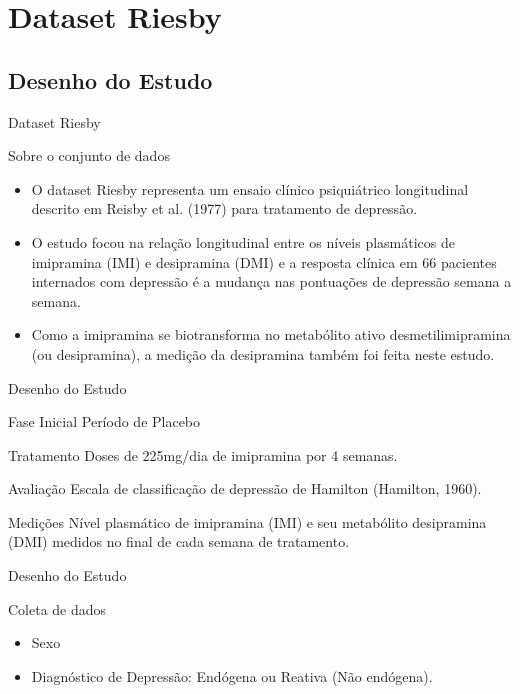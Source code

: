 \section{Dataset Riesby}
\subsection{Desenho do Estudo}
\begin{frame}{Dataset Riesby}
    \begin{block}{Sobre o conjunto de dados}
    	\begin{itemize}
    		\justifying
    		\item O dataset Riesby representa um ensaio clínico psiquiátrico longitudinal descrito em Reisby et al. (1977) para tratamento de depressão.
    		\item O estudo focou na relação longitudinal entre os níveis plasmáticos de imipramina (IMI) e desipramina (DMI) e a resposta clínica em 66 pacientes internados com depressão é a mudança nas pontuações de depressão semana a semana.
    		\item Como a imipramina se biotransforma no metabólito ativo desmetilimipramina (ou desipramina), a medição da desipramina também foi feita neste estudo.
    	\end{itemize}
    \end{block}
\end{frame}

\begin{frame}{Desenho do Estudo}
	\begin{block}{Fase Inicial}
		Período de Placebo 
	\end{block}
	\begin{block}{Tratamento}
		Doses de 225mg/dia de imipramina por 4 semanas.
	\end{block}
	\begin{block}{Avaliação}
		Escala de classificação de depressão de Hamilton (Hamilton, 1960).
	\end{block}
	\begin{block}{Medições}
		Nível plasmático de imipramina (IMI) e seu metabólito desipramina (DMI) medidos no final de cada semana de tratamento.
	\end{block}
\end{frame}

\begin{frame}{Desenho do Estudo}
	\begin{block}{Coleta de dados}
		\begin{itemize}
			\item Sexo
			\item Diagnóstico de Depressão: Endógena ou Reativa (Não endógena).
		\end{itemize}
	\end{block}
\end{frame}

